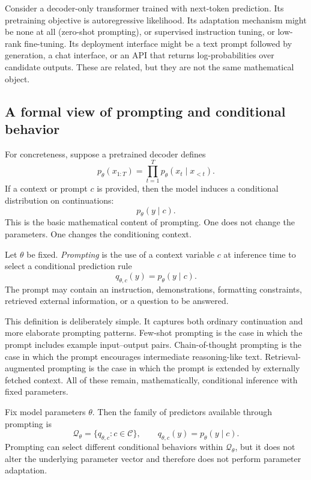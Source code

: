 \begin{example}
Consider a decoder-only transformer trained with next-token prediction.
Its pretraining objective is autoregressive likelihood.
Its adaptation mechanism might be none at all (zero-shot prompting), or supervised instruction tuning, or low-rank fine-tuning.
Its deployment interface might be a text prompt followed by generation, a chat interface, or an API that returns log-probabilities over candidate outputs.
These are related, but they are not the same mathematical object.
\end{example}

\subsection*{A formal view of prompting and conditional behavior}

For concreteness, suppose a pretrained decoder defines
\[
p_{\theta}(x_{1:T})
=
\prod_{t=1}^{T} p_{\theta}(x_t \mid x_{<t}).
\]
If a context or prompt $c$ is provided, then the model induces a conditional distribution on continuations:
\[
p_{\theta}(y \mid c).
\]
This is the basic mathematical content of prompting.
One does not change the parameters.
One changes the conditioning context.

\begin{definition}[Prompting]
Let $\theta$ be fixed.
\emph{Prompting} is the use of a context variable $c$ at inference time to select a conditional prediction rule
\[
q_{\theta,c}(y) = p_{\theta}(y \mid c).
\]
The prompt may contain an instruction, demonstrations, formatting constraints, retrieved external information, or a question to be answered.
\end{definition}

This definition is deliberately simple.
It captures both ordinary continuation and more elaborate prompting patterns.
Few-shot prompting is the case in which the prompt includes example input--output pairs.
Chain-of-thought prompting is the case in which the prompt encourages intermediate reasoning-like text.
Retrieval-augmented prompting is the case in which the prompt is extended by externally fetched context.
All of these remain, mathematically, conditional inference with fixed parameters.

\begin{proposition}
Fix model parameters $\theta$.
Then the family of predictors available through prompting is
\[
\mathcal{Q}_{\theta}
=
\{q_{\theta,c} : c \in \mathcal{C}\},
\qquad
q_{\theta,c}(y)=p_{\theta}(y \mid c).
\]
Prompting can select different conditional behaviors within $\mathcal{Q}_{\theta}$, but it does not alter the underlying parameter vector and therefore does not perform parameter adaptation.
\end{proposition}

